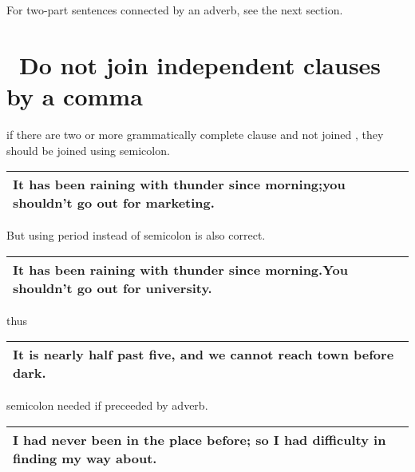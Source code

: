 \documentclass[10pt]{report}
\begin{document}
	For two-part sentences connected by an adverb, see the next section.  
	
	
	\section {\bfseries \ Do not join independent clauses by a comma} 
 \label{sec:six}
	
	if there are two or more grammatically complete clause and not joined , they
should be joined using semicolon.

\begin{table}[!tbh]
    \centering
        \begin{tabular}{|l|}
        \hline
    It has been raining with thunder since morning;you shouldn’t go out
for marketing.\\
        \hline

        

 \end{tabular}
 \end{table}

But using period instead of semicolon is also correct.
\begin{table}[!tbh]
    \centering
        \begin{tabular}{|l|}
        \hline
     It has been raining with thunder since morning.You shouldn’t go out
for university.\\
\hline
        

 \end{tabular}
 \end{table}

 thus
 
 \begin{table}[!tbh]
    \centering
        \begin{tabular}{|l|}
        \hline
    It is nearly half past five, and we cannot reach town before
dark.\\
        \hline
        
      
        

 \end{tabular}
 \end{table}
 
   semicolon needed if preceeded by adverb.
 
 
 \begin{table}[!tbh]
    \centering
        \begin{tabular}{|l|}
        \hline
     I had never been in the place before; so I had difficulty in
finding my way about.\\
        \hline
        

 \end{tabular}
 \end{table}
\end{document}
